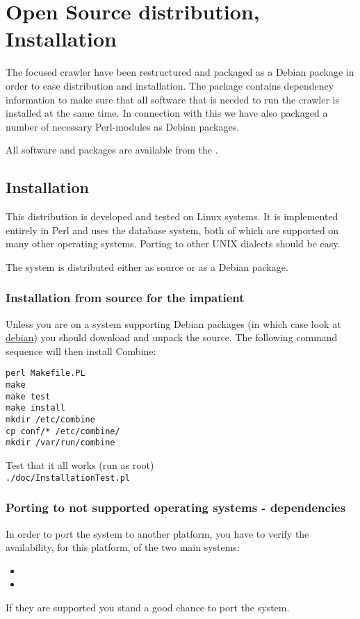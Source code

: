 \section{Open Source distribution, Installation}
\label{distr}
The focused crawler have been restructured and packaged as a Debian
package in order to ease distribution and installation. The package
contains dependency information to make sure that all software that is
needed to run the crawler is installed at the same time. In connection
with this we have also packaged a number of necessary Perl-modules as
Debian packages.

All software and packages are available from the .

\subsection{Installation}
This distribution is developed and tested on Linux systems.
It is implemented entirely in Perl and uses the 
database system, both of which are supported on many other
operating systems. Porting to other UNIX dialects should be easy.

The system is distributed either as source or as a Debian package.

\subsubsection{Installation from source for the impatient}
Unless you are on a system supporting Debian packages (in which case look at \hyperref{Automated installation}{Automated installation (section }{)}{debian}) you should
download and unpack the source.
The following command sequence will then install Combine:
\begin{verbatim}
perl Makefile.PL
make
make test
make install
mkdir /etc/combine
cp conf/* /etc/combine/
mkdir /var/run/combine
\end{verbatim}

Test that it all works (run as root)\\
{\tt ./doc/InstallationTest.pl}

\subsubsection{Porting to not supported operating systems - dependencies}
In order to port the system to another platform, you
have to verify the availability, for this platform, of the two main systems:
\begin{itemize}
\item {}
\item {}
\end{itemize}
If they are supported you stand a good chance to port the system.

